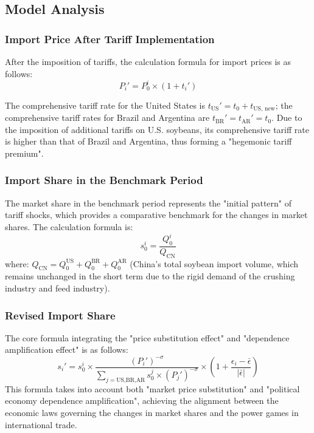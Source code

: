 \documentclass{apmcmthesis}
\begin{document}
\subsection{Model Analysis}
\subsubsection{Import Price After Tariff Implementation}
After the imposition of tariffs, the calculation formula for import prices is as follows:
\begin{equation}
P_{i}' = P_{0}^{i} \times \left(1 + t_{i}'\right)
\end{equation}

The comprehensive tariff rate for the United States is $t_{\text{US}}' = t_0 + t_{\text{US, new}}$; 
the comprehensive tariff rates for Brazil and Argentina are $t_{\text{BR}}' = t_{\text{AR}}' = t_0$. 
Due to the imposition of additional tariffs on U.S. soybeans, its comprehensive tariff rate is higher than that of Brazil and Argentina, thus forming a "hegemonic tariff premium".

\subsubsection{Import Share in the Benchmark Period}
The market share in the benchmark period represents the "initial pattern" of tariff shocks, which provides a comparative benchmark for the changes in market shares. The calculation formula is:
\begin{equation}
s_{0}^{i} = \frac{Q_{0}^{i}}{Q_{\text{CN}}}
\end{equation}
where: $Q_{\text{CN}} = Q_{0}^{\text{US}} + Q_{0}^{\text{BR}} + Q_{0}^{\text{AR}}$ (China's total soybean import volume, which remains unchanged in the short term due to the rigid demand of the crushing industry and feed industry).

\subsubsection{Revised Import Share}
The core formula integrating the "price substitution effect" and "dependence amplification effect" is as follows:
\[
s_i' = s_0^i \times \frac{(P_i')^{-\sigma}}{\sum_{j=\text{US,BR,AR}} s_0^j \times (P_j')^{-\sigma}} \times \left(1 + \frac{\epsilon_i - \bar{\epsilon}}{|\bar{\epsilon}|}\right)
\]
This formula takes into account both "market price substitution" and "political economy dependence amplification", achieving the alignment between the economic laws governing the changes in market shares and the power games in international trade.
\end{document}

